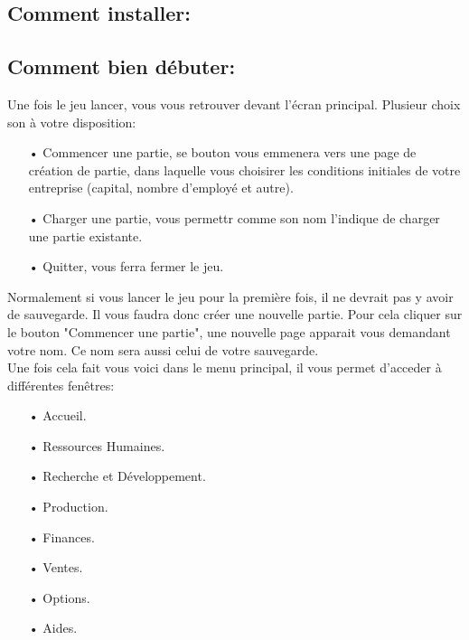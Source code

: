 \subsection{Comment installer:}



\subsection{Comment bien débuter:}



Une fois le jeu lancer, vous vous retrouver devant l'écran principal. Plusieur choix son à votre disposition:



\begin{enumerate}
	\item[•] Commencer une partie, se bouton vous emmenera vers une page de création de partie, dans laquelle vous choisirer les conditions initiales de votre entreprise (capital, nombre d'employé et autre).
	\item[•] Charger une partie, vous permettr comme son nom l'indique de charger une partie existante.
	\item[•] Quitter, vous ferra fermer le jeu.
\end{enumerate}

Normalement si vous lancer le jeu pour la première fois, il ne devrait pas y avoir de sauvegarde. Il vous faudra donc créer une nouvelle partie.  Pour cela cliquer sur le bouton "Commencer une partie", une nouvelle page apparait vous demandant votre nom. Ce nom sera aussi celui de votre sauvegarde.\\

Une fois cela fait vous voici dans le menu principal, il vous permet d'acceder à différentes fenêtres:



\begin{enumerate}
    \item[•] Accueil.
    \item[•] Ressources Humaines.
    \item[•] Recherche et Développement.
    \item[•] Production.
    \item[•] Finances.
    \item[•] Ventes.
    \item[•] Options.
    \item[•] Aides. 
\end{enumerate}



